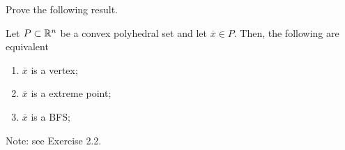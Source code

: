 Prove the following result.

\begin{theorem*}
	Let $P \subset \mathbb{R}^n$ be a convex polyhedral set and let $\overline{x} \in P$. Then, the following are equivalent
	\begin{enumerate}
		\item $\overline{x}$ is a vertex;
		\item $\overline{x}$ is a extreme point;
		\item $\overline{x}$ is a BFS;	
	\end{enumerate}
\end{theorem*}

Note: see Exercise 2.2.